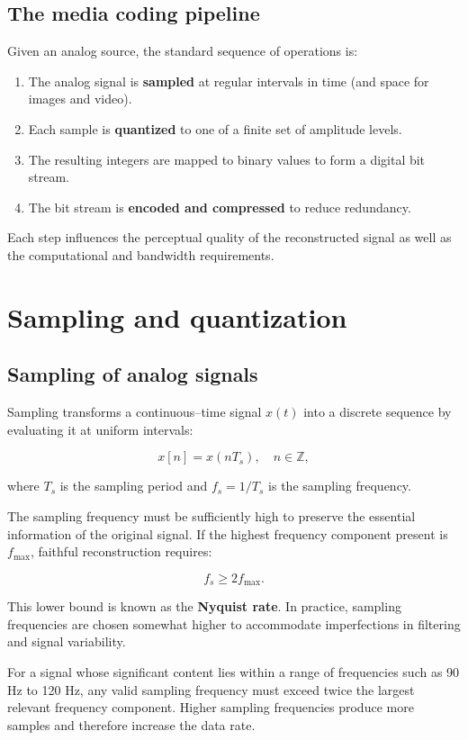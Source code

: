 \documentclass[11pt,a4paper,openany]{report}
\begin{document}
\subsection{The media coding pipeline}

Given an analog source, the standard sequence of operations is:

\begin{enumerate}
\item The analog signal is \textbf{sampled} at regular intervals in time (and space for images and video).
\item Each sample is \textbf{quantized} to one of a finite set of amplitude levels.
\item The resulting integers are mapped to binary values to form a digital bit stream.
\item The bit stream is \textbf{encoded and compressed} to reduce redundancy.
\end{enumerate}

Each step influences the perceptual quality of the reconstructed signal as well as the computational and bandwidth requirements.

\section{Sampling and quantization}

\subsection{Sampling of analog signals}

Sampling transforms a continuous--time signal $x(t)$ into a discrete sequence by evaluating it at uniform intervals:

\[ x[n] = x(nT_s), \quad n \in \mathbb{Z}, \]

\noindent where $T_s$ is the sampling period and $f_s = 1/T_s$ is the sampling frequency.

The sampling frequency must be sufficiently high to preserve the essential information of the original signal. If the highest frequency component present is $f_{\max}$, faithful reconstruction requires:

\[ f_s \ge 2 f_{\max}. \]

This lower bound is known as the \textbf{Nyquist rate}. In practice, sampling frequencies are chosen somewhat higher to accommodate imperfections in filtering and signal variability.

For a signal whose significant content lies within a range of frequencies such as 90 Hz to 120 Hz, any valid sampling frequency must exceed twice the largest relevant frequency component. Higher sampling frequencies produce more samples and therefore increase the data rate.
\end{document}
